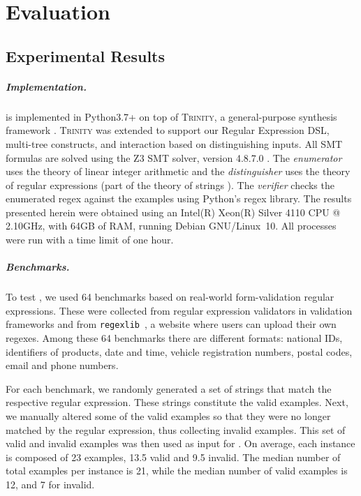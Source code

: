\chapter{Evaluation}

\section{Experimental Results}

\paragraph{Implementation.}
\Forest{} is implemented in Python3.7+ on top of \textsc{Trinity}, a general-purpose synthesis framework \cite{trinity19}. \textsc{Trinity} was extended to support our Regular Expression \ac{DSL}, multi-tree constructs, and interaction based on distinguishing inputs. All \ac{SMT} formulas are solved using the Z3 SMT solver, version  4.8.7.0 \cite{z3}. The \textit{enumerator} uses the theory of linear integer arithmetic and the \textit{distinguisher} uses the theory of regular expressions (part of the theory of strings \cite{z3str317}). The \textit{verifier} checks the enumerated regex against the examples using Python's regex library.
%
The results presented herein were obtained using an Intel(R) Xeon(R) Silver 4110 CPU @ 2.10GHz, with 64GB of RAM, running Debian GNU/Linux~10. All processes were run with a time limit of one hour.

\paragraph{Benchmarks.} To test \Forest{}, we used 64 benchmarks based on real-world form-validation regular expressions. These were collected from regular expression validators in validation frameworks and from \texttt{regexlib}~\cite{regexlib}, a website where users can upload their own regexes. Among these 64 benchmarks there are different formats: national IDs, identifiers of products, date and time, vehicle registration numbers, postal codes, email and phone numbers.

For each benchmark, we randomly generated a set of strings that match the respective regular expression. These strings constitute the valid examples. Next, we manually altered some of the valid examples so that they were no longer matched by the regular expression, thus collecting invalid examples. This set of valid and invalid examples was then used as input for \Forest{}.
On average, each instance is composed of 23 examples, 13.5 valid and 9.5 invalid. The median number of total examples per instance is 21, while the median number of valid examples is 12, and 7 for invalid.

